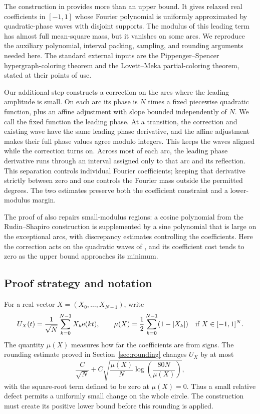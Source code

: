 The construction in \cite{OpenAIMinimal} provides more than an upper bound.
It gives relaxed real coefficients in $[-1,1]$ whose Fourier polynomial
is uniformly approximated by quadratic-phase waves with disjoint supports.
The modulus of this leading term has almost full mean-square mass, but it vanishes
on some arcs. We reproduce the auxiliary polynomial, interval packing,
sampling, and rounding arguments needed here. The standard external
inputs are the Pippenger--Spencer hypergraph-coloring theorem and the
Lovett--Meka partial-coloring theorem, stated at their points of use.

Our additional step constructs a correction on the arcs where the leading
amplitude is small. On each arc its phase is $N$ times a fixed piecewise
quadratic function, plus an affine adjustment with slope bounded
independently of $N$. We call the fixed function the leading phase.
At a transition, the correction and existing wave have the same leading
phase derivative, and the affine adjustment makes their full phase values
agree modulo integers. This keeps the waves aligned while the correction turns on.
Across most of each arc, the leading phase derivative runs through an
interval assigned only to that arc and its reflection. This separation controls individual
Fourier coefficients; keeping that derivative strictly between zero and
one controls the Fourier mass
outside the permitted degrees. The two estimates preserve both the
coefficient constraint and a lower-modulus margin.

The proof of \cite{BalisterEtAl2020} also repairs small-modulus regions:
a cosine polynomial from the Rudin--Shapiro construction is supplemented
by a sine polynomial that is large on the exceptional arcs, with
discrepancy estimates controlling the coefficients. Here the correction
acts on the quadratic waves of \cite{OpenAIMinimal}, and its coefficient
cost tends to zero as the upper bound approaches its minimum.

\subsection{Proof strategy and notation}
For a real vector $X=(X_0,\ldots,X_{N-1})$, write
\[
 U_X(t)=\frac1{\sqrt N}\sum_{k=0}^{N-1}X_k\mathrm e(kt),
 \qquad
 \mu(X)=\frac12\sum_{k=0}^{N-1}(1-|X_k|)
 \quad\text{if }X\in[-1,1]^N.
\]
The quantity $\mu(X)$ measures how far the coefficients are from signs.
The rounding estimate proved in Section~\ref{sec:rounding} changes $U_X$
by at most
\[
 \frac C{\sqrt N}
 +C\sqrt{\frac{\mu(X)}N
          \log\!\left(\frac{80N}{\mu(X)}\right)},
\]
with the square-root term defined to be zero at $\mu(X)=0$.
Thus a small relative defect permits a uniformly small change on the whole
circle. The construction must create its positive lower bound before this
rounding is applied.

